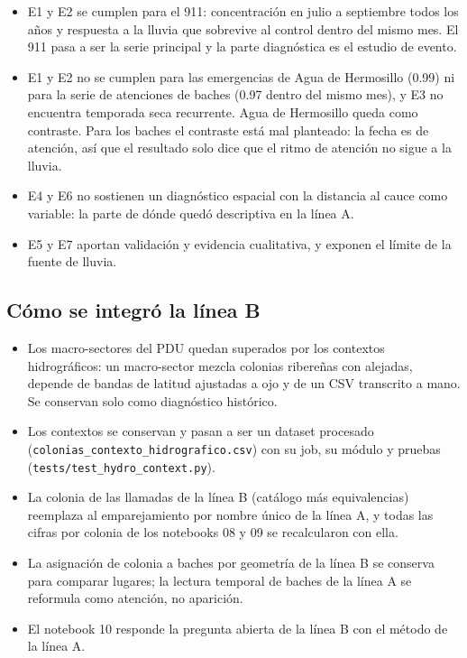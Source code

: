 \documentclass[11pt]{article}
\newcommand{\cod}[1]{\nolinkurl{#1}}
\begin{document}
\begin{itemize}
  \item E1 y E2 se cumplen para el 911: concentración en julio a septiembre todos los años y respuesta a la lluvia que sobrevive al control dentro del mismo mes. El 911 pasa a ser la serie principal y la parte diagnóstica es el estudio de evento.
  \item E1 y E2 no se cumplen para las emergencias de Agua de Hermosillo (0.99) ni para la serie de atenciones de baches (0.97 dentro del mismo mes), y E3 no encuentra temporada seca recurrente. Agua de Hermosillo queda como contraste. Para los baches el contraste está mal planteado: la fecha es de atención, así que el resultado solo dice que el ritmo de atención no sigue a la lluvia.
  \item E4 y E6 no sostienen un diagnóstico espacial con la distancia al cauce como variable: la parte de dónde quedó descriptiva en la línea A.
  \item E5 y E7 aportan validación y evidencia cualitativa, y exponen el límite de la fuente de lluvia.
\end{itemize}

\subsection{Cómo se integró la línea B}

\begin{itemize}
  \item Los macro-sectores del PDU quedan superados por los contextos hidrográficos: un macro-sector mezcla colonias ribereñas con alejadas, depende de bandas de latitud ajustadas a ojo y de un CSV transcrito a mano. Se conservan solo como diagnóstico histórico.
  \item Los contextos se conservan y pasan a ser un dataset procesado (\cod{colonias_contexto_hidrografico.csv}) con su job, su módulo y pruebas (\cod{tests/test_hydro_context.py}).
  \item La colonia de las llamadas de la línea B (catálogo más equivalencias) reemplaza al emparejamiento por nombre único de la línea A, y todas las cifras por colonia de los notebooks 08 y 09 se recalcularon con ella.
  \item La asignación de colonia a baches por geometría de la línea B se conserva para comparar lugares; la lectura temporal de baches de la línea A se reformula como atención, no aparición.
  \item El notebook 10 responde la pregunta abierta de la línea B con el método de la línea A.
\end{itemize}
\end{document}
